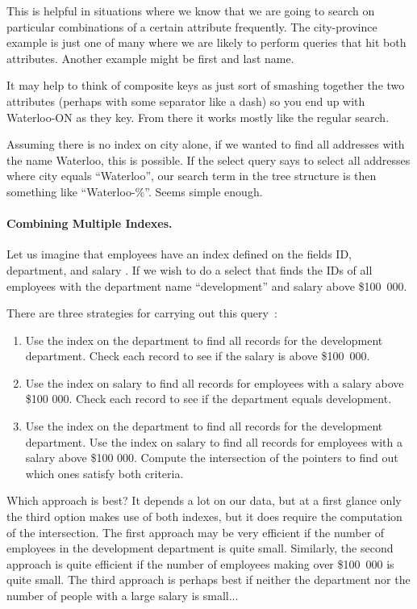 This is helpful in situations where we know that we are going to search on particular combinations of a certain attribute frequently. The city-province example is just one of many where we are likely to perform queries that hit both attributes. Another example might be first and last name.

It may help to think of composite keys as just sort of smashing together the two attributes (perhaps with some separator like a dash) so you end up with Waterloo-ON as they key. From there it works mostly like the regular search. 

Assuming there is no index on city alone, if we wanted to find all addresses with the name Waterloo, this is possible. If the select query says to select all addresses where city equals ``Waterloo'', our search term in the tree structure is then something like ``Waterloo-\%''. Seems simple enough. 


\paragraph{Combining Multiple Indexes.} Let us imagine that employees have an index defined on the fields ID, department, and salary . If we wish to do a select that finds the IDs of all employees with the department name ``development'' and salary above \$100~000. 

There are three strategies for carrying out this query~\cite{dsc}:

\begin{enumerate}
	\item Use the index on the department to find all records for the development department. Check each record to see if the salary is above \$100~000.
	\item Use the index on salary to find all records for employees with a salary above \$100 000. Check each record to see if the department equals development.
	\item Use the index on the department to find all records for the development department. Use the index on salary to find all records for employees with a salary above \$100 000. Compute the intersection of the pointers to find out which ones satisfy both criteria.
\end{enumerate}

Which approach is best? It depends a lot on our data, but at a first glance only the third option makes use of both indexes, but it does require the computation of the intersection. The first approach may be very efficient if the number of employees in the development department is quite small. Similarly, the second approach is quite efficient if the number of employees making over \$100~000 is quite small. The third approach is perhaps best if neither the department nor the number of people with a large salary is small...

